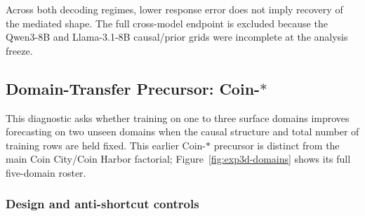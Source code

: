 \begin{center}
\begin{minipage}{\linewidth}
\centering
{}
\label{tab:exp3-coin-greedy}
\scriptsize
\setlength{\tabcolsep}{2.5pt}
\resizebox{\linewidth}{!}{}
\end{minipage}
\end{center}

Across both decoding regimes, lower response error does not imply recovery of the
mediated shape. The full cross-model endpoint is excluded because the Qwen3-8B and
Llama-3.1-8B causal/prior grids were incomplete at the analysis freeze.


\subsection{Domain-Transfer Precursor: Coin-\texorpdfstring{$*$}{*}}
\label{app:exp3-domains}

This diagnostic asks whether training on one to three
surface domains improves forecasting on two unseen domains when the causal
structure and total number of training rows are held fixed. This earlier
Coin-$*$ precursor is distinct from the main Coin City/Coin Harbor factorial;
Figure~\ref{fig:exp3d-domains} shows its full five-domain roster.



\subsubsection{Design and anti-shortcut controls}

